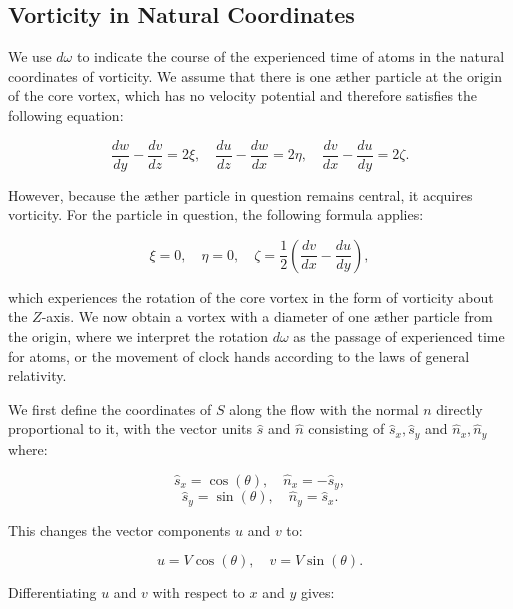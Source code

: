 
\subsection{Vorticity in Natural Coordinates}


We use $d\omega$ to indicate the course of the experienced time of atoms in the natural coordinates of vorticity. We assume that there is one æther particle at the origin of the core vortex, which has no velocity potential and therefore satisfies the following equation:


\begin{equation*}
\frac{d w}{d y}-\frac{d v}{d z}=2 \xi, \quad \frac{d u}{d z}-\frac{d w}{d x}=2 \eta, \quad \frac{d v}{d x}-\frac{d u}{d y}=2 \zeta.
\end{equation*}


However, because the æther particle in question remains central, it acquires vorticity. For the particle in question, the following formula applies:


\begin{equation*}
\xi=0, \quad \eta=0, \quad \zeta=\frac{1}{2}\left(\frac{d v}{d x}-\frac{d u}{d y}\right),
\end{equation*}


which experiences the rotation of the core vortex in the form of vorticity about the $Z$-axis. We now obtain a vortex with a diameter of one æther particle from the origin, where we interpret the rotation $d\omega$ as the passage of experienced time for atoms, or the movement of clock hands according to the laws of general relativity.


We first define the coordinates of $S$ along the flow with the normal $n$ directly proportional to it, with the vector units $\hat{s}$ and $\hat{n}$ consisting of $\hat{s}_x, \hat{s}_y$ and $\hat{n}_x, \hat{n}_y$ where:


\begin{equation*}
\hat{s}_x=\cos (\theta), \quad \hat{n}_x=-\hat{s}_y,
\end{equation*}
\begin{equation*}
\hat{s}_y=\sin (\theta), \quad \hat{n}_y=\hat{s}_x.
\end{equation*}


This changes the vector components $u$ and $v$ to:


\begin{equation*}
u=V \cos (\theta), \quad v=V \sin (\theta).
\end{equation*}


Differentiating $u$ and $v$ with respect to $x$ and $y$ gives:



